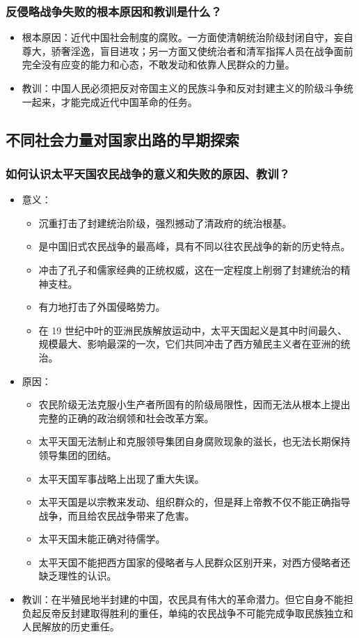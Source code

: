 \documentclass{article}
\begin{document}
\subsubsection{反侵略战争失败的根本原因和教训是什么？}
\begin{itemize}
    \item 根本原因：近代中国社会制度的腐败。一方面使清朝统治阶级封闭自守，妄自尊大，骄奢淫逸，盲目进攻；另一方面又使统治者和清军指挥人员在战争面前完全没有应变的能力和心态，不敢发动和依靠人民群众的力量。
    \item 教训：中国人民必须把反对帝国主义的民族斗争和反对封建主义的阶级斗争统一起来，才能完成近代中国革命的任务。
\end{itemize}

\subsection{不同社会力量对国家出路的早期探索}

\subsubsection{如何认识太平天国农民战争的意义和失败的原因、教训？}
\begin{itemize}
    \item 意义：
    \begin{itemize}
        \item 沉重打击了封建统治阶级，强烈撼动了清政府的统治根基。
        \item 是中国旧式农民战争的最高峰，具有不同以往农民战争的新的历史特点。
        \item 冲击了孔子和儒家经典的正统权威，这在一定程度上削弱了封建统治的精神支柱。
        \item 有力地打击了外国侵略势力。
        \item 在 19 世纪中叶的亚洲民族解放运动中，太平天国起义是其中时间最久、规模最大、影响最深的一次，它们共同冲击了西方殖民主义者在亚洲的统治。
    \end{itemize}
    \item 原因：
    \begin{itemize}
        \item 农民阶级无法克服小生产者所固有的阶级局限性，因而无法从根本上提出完整的正确的政治纲领和社会改革方案。
        \item 太平天国无法制止和克服领导集团自身腐败现象的滋长，也无法长期保持领导集团的团结。
        \item 太平天国军事战略上出现了重大失误。
        \item 太平天国是以宗教来发动、组织群众的，但是拜上帝教不仅不能正确指导战争，而且给农民战争带来了危害。
        \item 太平天国未能正确对待儒学。
        \item 太平天国不能把西方国家的侵略者与人民群众区别开来，对西方侵略者还缺乏理性的认识。
    \end{itemize}
    \item 教训：在半殖民地半封建的中国，农民具有伟大的革命潜力。但它自身不能担负起反帝反封建取得胜利的重任，单纯的农民战争不可能完成争取民族独立和人民解放的历史重任。
\end{itemize}
\end{document}
